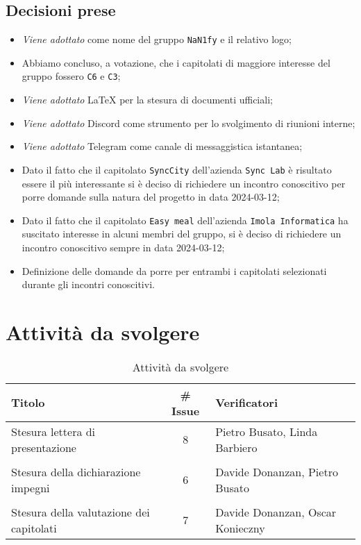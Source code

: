 \subsection{Decisioni prese}
\begin{itemize}
	\setlength\itemsep{0em}
	\item \textit{Viene adottato} come nome del gruppo \texttt{NaN1fy} e il relativo logo;
	\item Abbiamo concluso, a votazione, che i capitolati di maggiore interesse del gruppo fossero \texttt{C6} e \texttt{C3};
	\item \textit{Viene adottato} \LaTeX\: per la stesura di documenti ufficiali;
	\item \textit{Viene adottato} Discord come strumento per lo svolgimento di riunioni interne;
	\item \textit{Viene adottato} Telegram come canale di messaggistica istantanea;
	\item Dato il fatto che il capitolato \texttt{SyncCity} dell’azienda \texttt{Sync Lab} è risultato essere il più interessante si è deciso di richiedere un incontro conoscitivo per porre domande sulla natura del progetto in data 2024-03-12;
	\item Dato il fatto che il capitolato \texttt{Easy meal} dell’azienda \texttt{Imola Informatica} ha suscitato interesse in alcuni membri del gruppo, si è deciso di richiedere un incontro conoscitivo sempre in data 2024-03-12;
	\item Definizione delle domande da porre per entrambi i capitolati selezionati durante gli incontri conoscitivi.
\end{itemize}
\section{Attività da svolgere}
\begin{table}[ht!]
	\centering
	\begin{tabular}{lcl}
		\toprule
		\textbf{Titolo} & \textbf{\# Issue} & \textbf{Verificatori} \\
		\midrule
		Stesura lettera di presentazione & 8 & Pietro Busato, Linda Barbiero\\\\
		Stesura della dichiarazione impegni  &  6 & Davide Donanzan, Pietro Busato \\\\
		Stesura della valutazione dei capitolati & 7 & Davide Donanzan, Oscar Konieczny \\
		\bottomrule
	\end{tabular}
	\caption{Attività da svolgere}
	\label{table:Attivita da svolgere}
\end{table}


